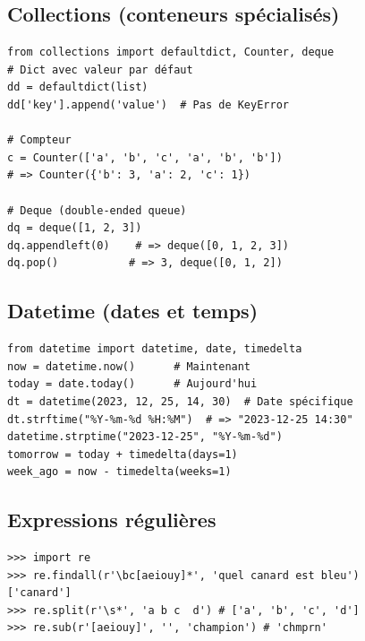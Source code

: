 \documentclass{article}
\begin{document}
\begin{multicols*}{4}
\subsection*{Collections (conteneurs spécialisés)}
\begin{lstlisting}
from collections import defaultdict, Counter, deque
# Dict avec valeur par défaut
dd = defaultdict(list)
dd['key'].append('value')  # Pas de KeyError

# Compteur
c = Counter(['a', 'b', 'c', 'a', 'b', 'b'])
# => Counter({'b': 3, 'a': 2, 'c': 1})

# Deque (double-ended queue)
dq = deque([1, 2, 3])
dq.appendleft(0)    # => deque([0, 1, 2, 3])
dq.pop()           # => 3, deque([0, 1, 2])
\end{lstlisting}

\subsection*{Datetime (dates et temps)}
\begin{lstlisting}
from datetime import datetime, date, timedelta
now = datetime.now()      # Maintenant
today = date.today()      # Aujourd'hui
dt = datetime(2023, 12, 25, 14, 30)  # Date spécifique
dt.strftime("%Y-%m-%d %H:%M")  # => "2023-12-25 14:30"
datetime.strptime("2023-12-25", "%Y-%m-%d")
tomorrow = today + timedelta(days=1)
week_ago = now - timedelta(weeks=1)
\end{lstlisting}

\subsection*{Expressions régulières}
\begin{lstlisting}
>>> import re
>>> re.findall(r'\bc[aeiouy]*', 'quel canard est bleu')
['canard']
>>> re.split(r'\s*', 'a b c  d') # ['a', 'b', 'c', 'd']
>>> re.sub(r'[aeiouy]', '', 'champion') # 'chmprn'\end{lstlisting}


\end{multicols*}
\end{document}
